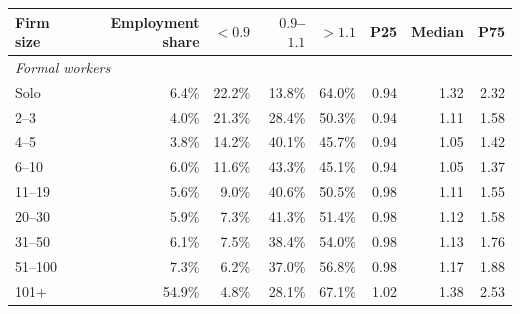 \begin{tabular}{lrrrrrrr}
\toprule
    Firm size & Employment share & $<0.9$ & $0.9$--$1.1$ & $>1.1$ & P25 & Median & P75 \\
    \midrule
\multicolumn{8}{l}{\textit{Formal workers}} \\
Solo & 6.4\% & 22.2\% & 13.8\% & 64.0\% & 0.94 & 1.32 & 2.32 \\
2--3 & 4.0\% & 21.3\% & 28.4\% & 50.3\% & 0.94 & 1.11 & 1.58 \\
4--5 & 3.8\% & 14.2\% & 40.1\% & 45.7\% & 0.94 & 1.05 & 1.42 \\
6--10 & 6.0\% & 11.6\% & 43.3\% & 45.1\% & 0.94 & 1.05 & 1.37 \\
11--19 & 5.6\% & 9.0\% & 40.6\% & 50.5\% & 0.98 & 1.11 & 1.55 \\
20--30 & 5.9\% & 7.3\% & 41.3\% & 51.4\% & 0.98 & 1.12 & 1.58 \\
31--50 & 6.1\% & 7.5\% & 38.4\% & 54.0\% & 0.98 & 1.13 & 1.76 \\
51--100 & 7.3\% & 6.2\% & 37.0\% & 56.8\% & 0.98 & 1.17 & 1.88 \\
101+ & 54.9\% & 4.8\% & 28.1\% & 67.1\% & 1.02 & 1.38 & 2.53\\
\bottomrule\end{tabular}
